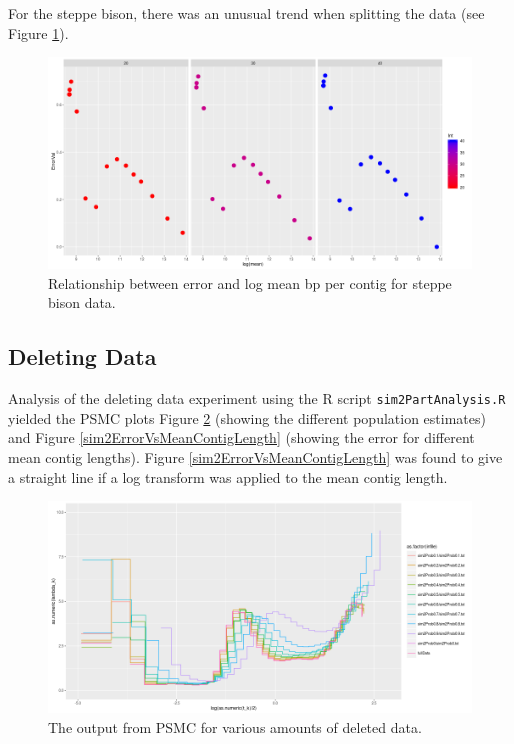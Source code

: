 \documentclass[11pt,a4paper]{article}
\begin{document}
For the steppe bison, there was an unusual trend when splitting the data (see Figure \ref{steppeBisonWeirdTrend}).

\begin{figure}[h]
  \center
  \includegraphics[width=.7\linewidth]{figures/steppeBisonWeirdTrend.png}
  \caption{Relationship between error and log mean bp per contig for steppe bison data.}\label{steppeBisonWeirdTrend}
\end{figure}

\subsection{Deleting Data}
Analysis of the deleting data experiment using the R script \verb|sim2PartAnalysis.R| yielded the PSMC plots Figure \ref{deletedDataPsmcPlots} (showing the different population estimates) and Figure \ref{sim2ErrorVsMeanContigLength} (showing the error for different mean contig lengths). Figure \ref{sim2ErrorVsMeanContigLength} was found to give a straight line if a log transform was applied to the mean contig length.

\begin{figure}[h]
  \center
  \includegraphics[width=1\linewidth]{figures/deletedDataPsmcPlots.png}
  \caption{The output from PSMC for various amounts of deleted data.}\label{deletedDataPsmcPlots}
\end{figure}
\end{document}
